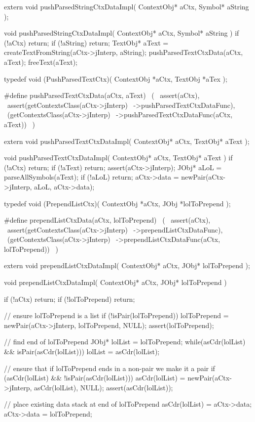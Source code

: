 \startCHeader
extern void pushParsedStringCtxDataImpl(
  ContextObj* aCtx,
  Symbol* aString
);
\stopCHeader
{}

\startCCode
void pushParsedStringCtxDataImpl(
  ContextObj* aCtx,
  Symbol* aString
) {
  if (!aCtx) return;
  if (!aString) return;
  TextObj* aText =
    createTextFromString(aCtx->jInterp, aString);
  pushParsedTextCtxData(aCtx, aText);
  freeText(aText);
}
\stopCCode

\startCHeader
typedef void (PushParsedTextCtx)(
  ContextObj *aCtx,
  TextObj    *aTex
);

#define pushParsedTextCtxData(aCtx, aText)      \
  (                                             \
    assert(aCtx),                               \
    assert(getContextsClass(aCtx->jInterp)      \
      ->pushParsedTextCtxDataFunc),             \
    (getContextsClass(aCtx->jInterp)            \
      ->pushParsedTextCtxDataFunc(aCtx, aText)) \
  )
\stopCHeader

\setCHeaderStream{private}
\startCHeader
extern void pushParsedTextCtxDataImpl(
  ContextObj* aCtx,
  TextObj* aText
);
\stopCHeader
\setCHeaderStream{public}

\startCCode
void pushParsedTextCtxDataImpl(
  ContextObj* aCtx,
  TextObj* aText
) {
  if (!aCtx) return;
  if (!aText) return;
  assert(aCtx->jInterp);
  JObj* aLoL = parseAllSymbols(aText);
  if (!aLoL) return;
  aCtx->data = newPair(aCtx->jInterp, aLoL, aCtx->data);
}
\stopCCode

\startCHeader
typedef void (PrependListCtx)(
  ContextObj *aCtx,
  JObj   *lolToPrepend
);

#define prependListCtxData(aCtx, lolToPrepend)      \
  (                                                 \
    assert(aCtx),                                   \
    assert(getContextsClass(aCtx->jInterp)          \
      ->prependListCtxDataFunc),                    \
    (getContextsClass(aCtx->jInterp)                \
      ->prependListCtxDataFunc(aCtx, lolToPrepend)) \
  )
\stopCHeader

\startCHeader
extern void prependListCtxDataImpl(
  ContextObj* aCtx,
  JObj* lolToPrepend
);
\stopCHeader
\setCHeaderStream{public}

\startCCode
void prependListCtxDataImpl(
  ContextObj* aCtx,
  JObj* lolToPrepend
) {
  if (!aCtx) return;
  if (!lolToPrepend) return;

  // ensure lolToPrepend is a list
  if (!isPair(lolToPrepend)) {
    lolToPrepend = newPair(aCtx->jInterp, lolToPrepend, NULL);
    assert(lolToPrepend);
  }

  // find end of lolToPrepend
  JObj* lolList = lolToPrepend;
  while(asCdr(lolList) && isPair(asCdr(lolList))) {
    lolList = asCdr(lolList);
  }

  // ensure that if lolToPrepend ends in a non-pair we make it a pair
  if (asCdr(lolList) && !isPair(asCdr(lolList))) {
    asCdr(lolList) = newPair(aCtx->jInterp, asCdr(lolList), NULL);
    assert(asCdr(lolList));
  }

  // place existing data stack at end of lolToPrepend
  asCdr(lolList) = aCtx->data;
  aCtx->data     = lolToPrepend;
}
\stopCCode

